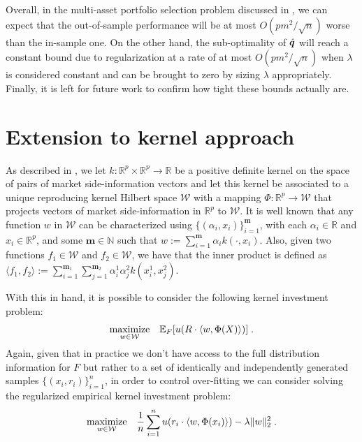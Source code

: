 \documentclass[]{interact}
\theoremstyle{plain}%
\theoremstyle{definition}
\theoremstyle{remark}
\def\Expect{{\mathbb E}}
\def\maximize{\mathop{\rm maximize}}
\newcommand{\0}{\V{0}}
\newcommand{\1}{\V{1}}
\renewcommand{\Re}{\mathbb{R}}
\newcommand{\modified}[1]{{\color{blue} #1}}
\theoremstyle{plain}
\theoremstyle{definition}
\begin{document}
Overall, in the multi-asset portfolio selection problem discussed in \cite{brandt2009parametric}, we can expect that the out-of-sample performance will be at most $O(pm^2/\sqrt{n})$ worse than the in-sample one. On the other hand, the sub-optimality of ${\hat{\boldsymbol{q}}}$ will reach a constant bound due to
  regularization at a rate of at most $O(pm^2/\sqrt{n})$ when $\lambda$ is considered constant and can be brought to zero by sizing $\lambda$ appropriately. Finally, it is left for future work to confirm how tight these bounds actually are.


%
\section{\modified{Extension to kernel approach}}\label{sec:kernel}


\newcommand{\kq}{{w}}
\newcommand{\kqhat}{{\hat{w}}}
\newcommand{\kn}{{\boldsymbol{m}}}
\newcommand{\kQ}{{\mathcal{W}}}
\newcommand{\Nat}{{\mathbb{N}}}
\newcommand{\Gram}{{\mathbb{K}}}


As described in \cite{kernel2008}, we let $k:\Re^p\times \Re^p\rightarrow \Re$ be a positive definite kernel on the space of pairs of market side-information vectors and let this kernel be associated to a unique reproducing kernel Hilbert space $\kQ$ with a mapping $\Phi:\Re^p \rightarrow \kQ$ that projects vectors of market side-information in $\Re^p$ to $\kQ$. It is well known that any function $\kq$ in $\kQ$ can be characterized using $\{(\alpha_i,x_i)\}_{i=1}^\kn$, with each $\alpha_i\in\Re$ and $x_i\in\Re^p$, and some $\kn\in\Nat$ such that $\kq:=\sum_{i=1}^\kn \alpha_i k(\cdot,x_i)$. Also, given two functions $f_1\in\kQ$ and $f_2\in\kQ$, we have that the inner product is defined as $\langle f_1,f_2\rangle:=\sum_{i=1}^{\kn_1}\sum_{j=1}^{\kn_2} \alpha_i^1 \alpha_j^2 k(x_i^1,x_j^2)$. 

With this in hand, it is possible to consider the following kernel investment problem:
\begin{equation}
 \maximize_{\kq\in\kQ}\;\;\;\Expect_\F[u(R \cdot \langle \kq, \Phi(X)\rangle)]\;.\label{EUF:kernel}
\end{equation}
Again, given that in practice we don't have access to the full distribution information for $F$ but rather to a set of identically and independently generated samples $\{(x_i,r_i)\}_{i=1}^n$, in order to control over-fitting we can consider solving the regularized empirical kernel investment problem:
\begin{equation}
 \maximize_{\kq\in\kQ}\;\;\;\frac{1}{n}\sum_{i=1}^n u(r_i \cdot \langle \kq, \Phi(x_i)\rangle) - \lambda \|\kq\|_2^2\;.\label{EUF:regKernel}
\end{equation}
\end{document}
